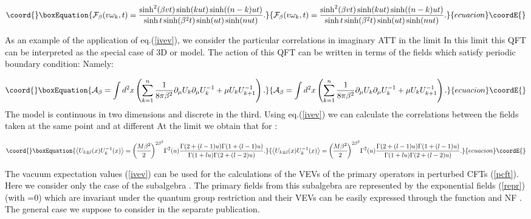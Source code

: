 \documentclass[a4paper,12pt]{article}
\begin{document}
\begin{equation}\coord{}\boxEquation{
{\cal F}_\beta (v\omega _k,t)=\frac{\sinh ^2(\beta vt)\sinh (kut)\sinh
((n-k)ut)}{\sinh t\sinh (\beta ^2t)\sinh (ut)\sinh (nut)}.  \label{fan}
}{
{\cal F}_\beta (v\omega _k,t)=\frac{\sinh ^2(\beta vt)\sinh (kut)\sinh
((n-k)ut)}{\sinh t\sinh (\beta ^2t)\sinh (ut)\sinh (nut)}.  }{ecuacion}\coordE{}\end{equation}

As an example of the application of eq.(\ref{ivev}), we consider the
particular correlations in \coordHE{} imaginary ATT in the limit 
\coordHE{} In this limit this QFT can be interpreted as the
special case of 3D \coordHE{} or \coordHE{} model. The action of this QFT can be
written in terms of the fields \coordHE{} which satisfy periodic boundary condition: \coordHE{}
Namely:

\begin{equation}\coord{}\boxEquation{
{\cal A}_\beta =\int d^2x\left( \sum_{k=1}^n\frac 1{8\pi \beta ^2}\partial
_\mu U_k\partial _\mu U_k^{-1}+\mu U_kU_{k+1}^{-1}\right).  \label{xy}
}{
{\cal A}_\beta =\int d^2x\left( \sum_{k=1}^n\frac 1{8\pi \beta ^2}\partial
_\mu U_k\partial _\mu U_k^{-1}+\mu U_kU_{k+1}^{-1}\right).  }{ecuacion}\coordE{}\end{equation}
The model is continuous in two dimensions and discrete in the third. Using
eq.(\ref{ivev}) we can calculate the correlations between the fields 
\myHighlight{$U_k(x)$}\coordHE{} taken at the same point \coordHE{} and at different \coordHE{} At the limit 
\myHighlight{$n\rightarrow \infty $}\coordHE{} we obtain that for \myHighlight{$l>0$}\coordHE{}:

\begin{equation}\coord{}\boxEquation{
\left\langle U_{k\pm l}(x)U_k^{-1}(x)\right\rangle =
{M\beta ^2 \overwithdelims() 2}
^{2\beta ^2}\Gamma ^2(u)\frac{\Gamma (2+(l-1)u)\Gamma (1+(l-1)u)}{\Gamma
(1+lu)\Gamma (2+(l-2)u)}.  \label{cxy}
}{
\left\langle U_{k\pm l}(x)U_k^{-1}(x)\right\rangle =
{M\beta ^2 \overwithdelims() 2}
^{2\beta ^2}\Gamma ^2(u)\frac{\Gamma (2+(l-1)u)\Gamma (1+(l-1)u)}{\Gamma
(1+lu)\Gamma (2+(l-2)u)}.  }{ecuacion}\coordE{}\end{equation}

The vacuum expectation values (\ref{ivev}) can be 
used for the calculations of the VEVs of the
primary operators in perturbed CFTs \coordHE{} (\ref{pcft}). Here we
consider only the case of the subalgebra \myHighlight{$\Phi _\Omega$}\coordHE{}. The primary fields
from this subalgebra are represented by the exponential fields (\ref{repr})
(with \myHighlight{$\Omega^\prime$}\coordHE{}=0)
which are invariant under the quantum group restriction \cite{FLZ} and their
VEVs can be easily expressed through the function \myHighlight{${\cal G}(a)$}\coordHE{} and NF 
\myHighlight{${\cal N}(a)$}\coordHE{}. The general case we suppose to consider in the separate
publication.
\end{document}
